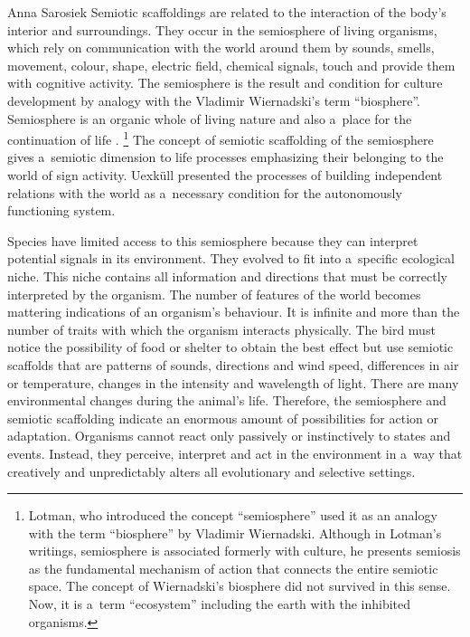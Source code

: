 \begin{artengenv}{Anna Sarosiek}
Semiotic scaffoldings are related to the interaction of the body’s interior and surroundings. They occur in the semiosphere of living organisms, which rely on communication with the world around them by sounds, smells, movement, colour, shape, electric field, chemical signals, touch and provide them with cognitive activity. The semiosphere is the result and condition for culture development by analogy with the Vladimir Wiernadski’s term ``biosphere''. Semiosphere is an organic whole of living nature and also a~place for the continuation of life
\parencite[][pp.12–126]{lotman_universe_1990}.%
\footnote{Lotman, who introduced the concept ``semiosphere'' used it as an analogy with the term ``biosphere'' by Vladimir Wiernadski. Although in Lotman’s writings, semiosphere is associated formerly with culture, he presents semiosis as the fundamental mechanism of action that connects the entire semiotic space. The concept of Wiernadski's biosphere did not survived in this sense. Now, it is a~term ``ecosystem'' including the earth with the inhibited organisms.} The concept of semiotic scaffolding of the semiosphere gives a~semiotic dimension to life processes emphasizing their belonging to the world of sign activity. Uexküll presented the processes of building independent relations with the world as a~necessary condition for the autonomously functioning system.

Species have limited access to this semiosphere because they can interpret potential signals in its environment. They evolved to fit into a~specific ecological niche. This niche contains all information and directions that must be correctly interpreted by the organism. The number of features of the world becomes mattering indications of an organism’s behaviour. It is infinite and more than the number of traits with which the organism interacts physically. The bird must notice the possibility of food or shelter to obtain the best effect but use semiotic scaffolds that are patterns of sounds, directions and wind speed, differences in air or temperature, changes in the intensity and wavelength of light. There are many environmental changes during the animal’s life. Therefore, the semiosphere and semiotic scaffolding indicate an enormous amount of possibilities for action or adaptation. Organisms cannot react only passively or instinctively to states and events. Instead, they perceive, interpret and act in the environment in a~way that creatively and unpredictably alters all evolutionary and selective settings.


\end{artengenv}
